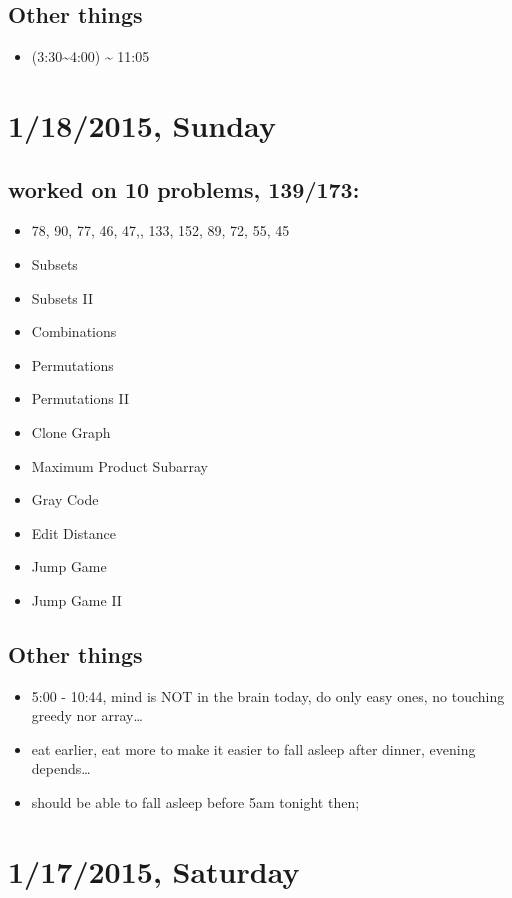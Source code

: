 \documentclass[9pt,b5paper]{article}
\begin{document}
\subsection{Other things}
\label{sec-7-2}
\begin{itemize}
\item (3:30\textasciitilde{}4:00) \textasciitilde{} 11:05
\end{itemize}
\section{1/18/2015, Sunday}
\label{sec-8}
\subsection{worked on 10 problems, 139/173:}
\label{sec-8-1}
\begin{itemize}
\item 78, 90, 77, 46, 47,, 133, 152, 89, 72, 55, 45
\item Subsets
\item Subsets II
\item Combinations
\item Permutations
\item Permutations II
\item Clone Graph
\item Maximum Product Subarray
\item Gray Code
\item Edit Distance
\item Jump Game
\item Jump Game II
\end{itemize}
\subsection{Other things}
\label{sec-8-2}
\begin{itemize}
\item 5:00 - 10:44, mind is NOT in the brain today, do only easy ones, no touching greedy nor array\ldots{}
\item eat earlier, eat more to make it easier to fall asleep after dinner, evening depends\ldots{}
\item should be able to fall asleep before 5am tonight then;
\end{itemize}
\section{1/17/2015, Saturday}
\label{sec-9}
\end{document}
